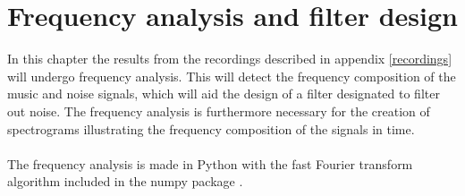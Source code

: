 \chapter{Frequency analysis and filter design} \label{ch9}
In this chapter the results from the recordings described in appendix \ref{recordings} will undergo frequency analysis. This will detect the frequency composition of the music and noise signals, which will aid the design of a filter designated to filter out noise. The frequency analysis is furthermore necessary for the creation of spectrograms illustrating the frequency composition of the signals in time. \\ \\
The frequency analysis is made in Python with the fast Fourier transform algorithm included in the numpy package .



